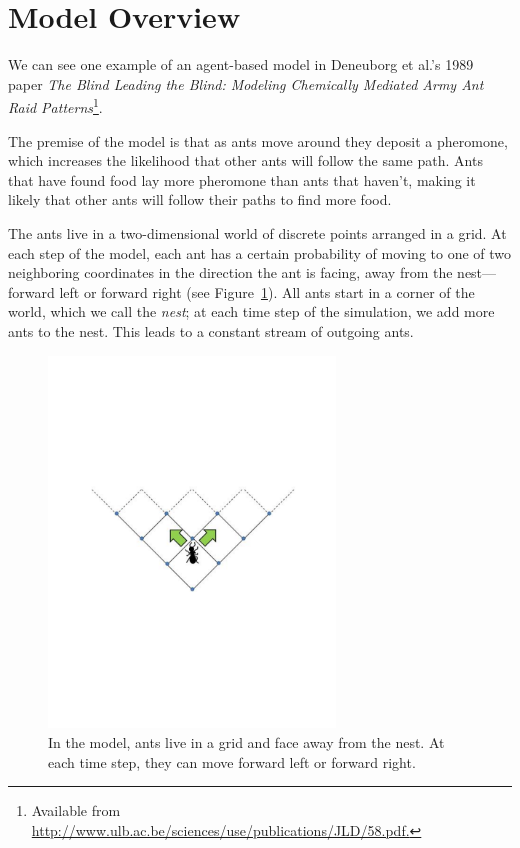 \documentclass[10pt]{book}
\begin{document}
\section{Model Overview}

We can see one example of an agent-based model in Deneuborg et al.'s
1989 paper \emph{The Blind Leading the Blind: Modeling Chemically
  Mediated Army Ant Raid Patterns}\footnote{Available from
\url{http://www.ulb.ac.be/sciences/use/publications/JLD/58.pdf.}}.

The premise of the model is that as ants move around they deposit
a pheromone, which increases the likelihood that other ants will follow
the same path. Ants that have found food lay more pheromone than ants
that haven't, making it likely that other ants will follow their paths
to find more food.

The ants live in a two-dimensional world of discrete points arranged
in a grid. At each step of the model, each ant has a certain
probability of moving to one of two neighboring coordinates in the
direction the ant is facing, away from the nest---forward left or
forward right (see Figure~\ref{fig.antchoice}). All ants start in a
corner of the world, which we call the \emph{nest}; at each time
step of the simulation, we add more ants to the nest. This leads to a
constant stream of outgoing ants.

\begin{figure}
\centerline{\includegraphics[width=3.0in]{figs/antchoice.pdf}}
\caption{In the model, ants live in a grid and face away from the nest. At each time step, they can move forward left or forward right.\label{fig.antchoice}}
\end{figure}
\end{document}
